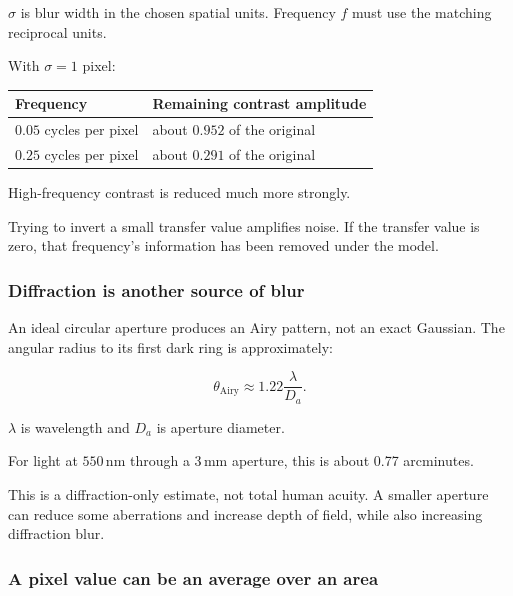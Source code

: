 \(\sigma\) is blur width in the chosen spatial units. Frequency \(f\) must use the matching reciprocal units.

With \(\sigma=1\) pixel:

{\def\LTcaptype{none} %
\begin{longtable}[]{@{}ll@{}}
\toprule\noalign{}
Frequency & Remaining contrast amplitude \\
\midrule\noalign{}
\endhead
\bottomrule\noalign{}
\endlastfoot
\(0.05\) cycles per pixel & about \(0.952\) of the original \\
\(0.25\) cycles per pixel & about \(0.291\) of the original \\
\end{longtable}
}

High-frequency contrast is reduced much more strongly.

Trying to invert a small transfer value amplifies noise. If the transfer value is zero, that frequency's information has been removed under the model.

\subsubsection{Diffraction is another source of blur}\label{04-visual-computing-ii-ch042-diffraction-is-another-source-of-blur}

\hypertarget{04-visual-computing-ii-ch042-diffraction-is-another-source-of-blur}{}

An ideal circular aperture produces an Airy pattern, not an exact Gaussian. The angular radius to its first dark ring is approximately:

\[
\theta_{\mathrm{Airy}}\approx1.22\frac{\lambda}{D_a}.
\]

\(\lambda\) is wavelength and \(D_a\) is aperture diameter.

For light at \(550\,\mathrm{nm}\) through a \(3\,\mathrm{mm}\) aperture, this is about 0.77 arcminutes.

This is a diffraction-only estimate, not total human acuity. A smaller aperture can reduce some aberrations and increase depth of field, while also increasing diffraction blur.

\subsubsection{A pixel value can be an average over an area}\label{04-visual-computing-ii-ch042-a-pixel-value-can-be-an-average-over-an-area}

